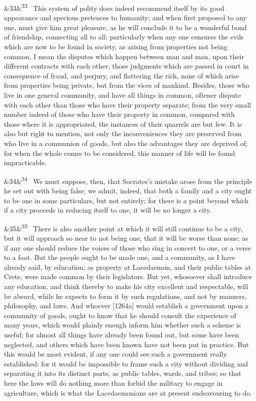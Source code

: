 \documentclass[12pt]{article}
\newcommand{\para}[1][]{\par\noindent\ifx&#1&\else\textsuperscript{\footnotesize #1}~\fi}
\begin{document}
\para[33] This system of polity does indeed recommend itself by its good appearance and specious pretences to humanity; and when first proposed to any one, must give him great pleasure, as he will conclude it to be a wonderful bond of friendship, connecting all to all; particularly when any one censures the evils which are now to be found in society, as arising from properties not being common, I mean the disputes which happen between man and man, upon their different contracts with each other; those judgments which are passed in court in consequence of fraud, and perjury, and flattering the rich, none of which arise from properties being private, but from the vices of mankind. Besides, those who live in one general community, and have all things in common, oftener dispute with each other than those who have their property separate; from the very small number indeed of those who have their property in common, compared with those where it is appropriated, the instances of their quarrels are but few. It is also but right to mention, not only the inconveniences they are preserved from who live in a communion of goods, but also the advantages they are deprived of; for when the whole comes to be considered, this manner of life will be found impracticable.

\para[34] We must suppose, then, that Socrates's mistake arose from the principle he set out with being false; we admit, indeed, that both a family and a city ought to be one in some particulars, but not entirely; for there is a point beyond which if a city proceeds in reducing itself to one, it will be no longer a city.

\para[35] There is also another point at which it will still continue to be a city, but it will approach so near to not being one, that it will be worse than none; as if any one should reduce the voices of those who sing in concert to one, or a verse to a foot. But the people ought to be made one, and a community, as I have already said, by education; as property at Lacedaemon, and their public tables at Crete, were made common by their legislators. But yet, whosoever shall introduce any education, and think thereby to make his city excellent and respectable, will be absurd, while he expects to form it by such regulations, and not by manners, philosophy, and laws. And whoever [1264a] would establish a government upon a community of goods, ought to know that he should consult the experience of many years, which would plainly enough inform him whether such a scheme is useful; for almost all things have already been found out, but some have been neglected, and others which have been known have not been put in practice. But this would be most evident, if any one could see such a government really established: for it would be impossible to frame such a city without dividing and separating it into its distinct parts, as public tables, wards, and tribes; so that here the laws will do nothing more than forbid the military to engage in agriculture, which is what the Lacedaemonians are at present endeavouring to do.
\end{document}
